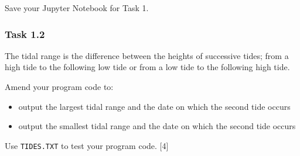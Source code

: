 Save your Jupyter Notebook for Task 1. 

\subsubsection*{Task 1.2 }

The tidal range is the difference between the heights of successive
tides; from a high tide to the following low tide or from a low tide
to the following high tide. 

Amend your program code to: 
\begin{itemize}
\item output the largest tidal range and the date on which the second tide
occurs 
\item output the smallest tidal range and the date on which the second tide
occurs 
\end{itemize}
Use \texttt{TIDES.TXT} to test your program code. \hfill{}{[}4{]}